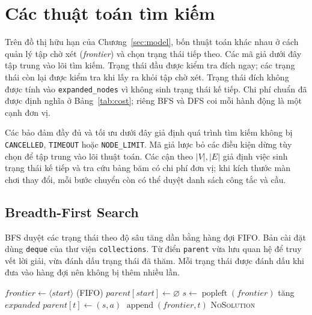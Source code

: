 \section{Các thuật toán tìm kiếm}
\label{sec:algorithms}

Trên đồ thị hữu hạn của Chương~\ref{sec:model}, bốn thuật toán khác nhau ở cách
quản lý tập chờ xét (\emph{frontier}) và chọn trạng thái tiếp theo. Các mã giả
dưới đây tập trung vào lõi tìm kiếm. Trạng thái đầu được kiểm tra đích ngay;
các trạng thái còn lại được kiểm tra khi lấy ra khỏi tập chờ xét. Trạng thái
đích không được tính vào \texttt{expanded\_nodes} vì không sinh trạng thái kế
tiếp. Chi phí chuẩn đã được định nghĩa ở Bảng~\ref{tab:cost}; riêng BFS và DFS
coi mỗi hành động là một cạnh đơn vị.

Các bảo đảm đầy đủ và tối ưu dưới đây giả định quá trình tìm kiếm không bị
\texttt{CANCELLED}, \texttt{TIMEOUT} hoặc \texttt{NODE\_LIMIT}. Mã giả lược bỏ
các điều kiện dừng tùy chọn để tập trung vào lõi thuật toán. Các cận theo
$|V|,|E|$ giả định việc sinh trạng thái kế tiếp và tra cứu bảng băm có chi phí
đơn vị; khi kích thước màn chơi thay đổi, mỗi bước chuyển còn có thể duyệt
danh sách công tắc và cầu.

\subsection{Breadth-First Search}

BFS duyệt các trạng thái theo độ sâu tăng dần bằng hàng đợi FIFO. Bản cài đặt
dùng \texttt{deque} của thư viện \texttt{collections}. Từ điển \texttt{parent}
vừa lưu quan hệ để truy vết lời giải, vừa đánh dấu trạng thái đã thăm. Mỗi
trạng thái được đánh dấu khi đưa vào hàng đợi nên không bị thêm nhiều lần.

\begin{algorithm}[H]
\caption{BFS trong hệ thống}
\label{alg:bfs}
\begin{algorithmic}[1]
\State $\mathit{frontier}\gets\langle start\rangle$ (FIFO)
\State $\mathit{parent}[start]\gets\varnothing$
    \State $s\gets\operatorname{popleft}(\mathit{frontier})$
     \State \Return {} \EndIf
    \State tăng $expanded$
            \State $\mathit{parent}[t]\gets(s,a)$
            \State $\operatorname{append}(\mathit{frontier},t)$
        \EndIf
    \EndFor
\EndWhile
\State \Return \textsc{NoSolution}
\EndFunction
\end{algorithmic}
\end{algorithm}

